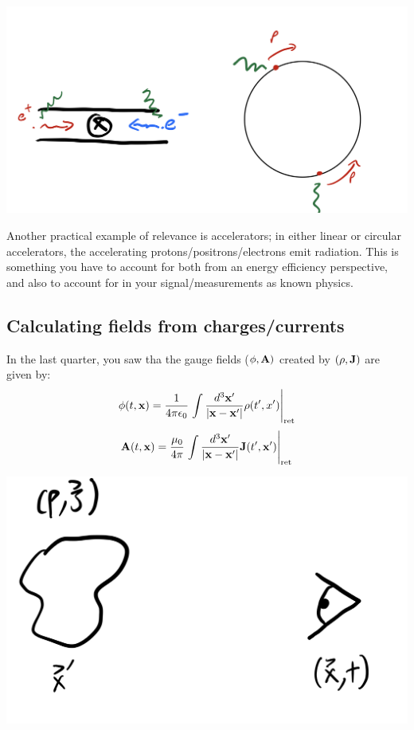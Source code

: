 \begin{center}
    \includegraphics[scale=0.4]{Lectures/Images/lec8-radiation.png}
\end{center}

Another practical example of relevance is accelerators; in either linear or circular accelerators, the accelerating protons/positrons/electrons emit radiation. This is something you have to account for both from an energy efficiency perspective, and also to account for in your signal/measurements as known physics.

\subsection{Calculating fields from charges/currents}
In the last quarter, you saw tha the gauge fields ($\phi, \mathbf{A})$ created by $(\rho, \mathbf{J})$ are given by:
\begin{equation}
    \phi(t, \mathbf{x}) = \frac{1}{4\pi\epsilon_0}\left.\int \frac{d^3\mathbf{x}'}{\lvert \mathbf{x} - \mathbf{x}' \rvert}\rho(t', x')\right|_{\text{ret}}
\end{equation}
\begin{equation}
    \mathbf{A}(t, \mathbf{x}) = \frac{\mu_0}{4\pi}\left.\int \frac{d^3\mathbf{x}'}{\lvert \mathbf{x} - \mathbf{x}' \rvert}\mathbf{J}(t', \mathbf{x}')\right|_{\text{ret}}
\end{equation}

\begin{center}
    \includegraphics[scale=0.4]{Lectures/Images/lec8-fields.png}
\end{center}

